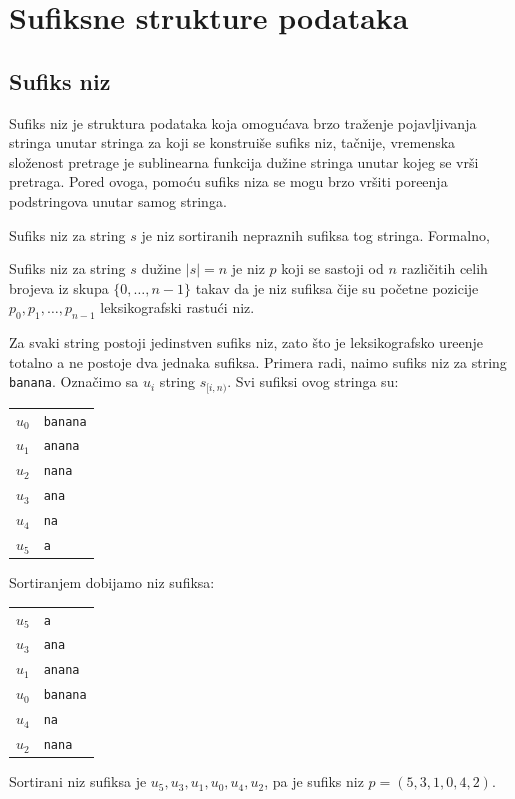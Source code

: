 \section{Sufiksne strukture podataka}

\subsection{Sufiks niz}

Sufiks niz je struktura podataka koja omogu\' cava brzo tra\v zenje pojavljivanja stringa unutar stringa za koji se konstrui\v se sufiks niz, ta\v cnije, vremenska slo\v zenost pretrage je sublinearna funkcija du\v zine stringa unutar kojeg se vr\v si pretraga. Pored ovoga, pomo\' cu sufiks niza se mogu brzo vr\v siti pore\dj enja podstringova unutar samog stringa. \cite{sufiksnizprvirad}

Sufiks niz za string $s$ je niz sortiranih nepraznih sufiksa tog stringa. Formalno,

\begin{dfn}
Sufiks niz za string $s$ du\v zine $|s| = n$ je niz $p$ koji se sastoji od $n$ razli\v citih celih brojeva iz skupa $\{0,\ldots,n-1\}$ takav da je niz sufiksa \v cije su po\v cetne pozicije $p_0, p_1, \ldots, p_{n-1}$ leksikografski rastu\' ci niz.
\end{dfn}

Za svaki string postoji jedinstven sufiks niz, zato \v sto je leksikografsko ure\dj enje totalno a ne postoje dva jednaka sufiksa. Primera radi, na\dj imo sufiks niz za string \texttt{banana}. Ozna\v cimo sa $u_i$ string $s_{[i,n)}$. Svi sufiksi ovog stringa su:
\begin{center}
\begin{tabular}{cl}
    $u_0$ & \texttt{banana} \\
    $u_1$ & \texttt{anana} \\
    $u_2$ & \texttt{nana} \\
    $u_3$ & \texttt{ana} \\
    $u_4$ & \texttt{na} \\
    $u_5$ & \texttt{a} \\
\end{tabular}
\end{center}
Sortiranjem dobijamo niz sufiksa:
\begin{center}
\begin{tabular}{cl}
    $u_5$ & \texttt{a} \\
    $u_3$ & \texttt{ana} \\
    $u_1$ & \texttt{anana} \\
    $u_0$ & \texttt{banana} \\
    $u_4$ & \texttt{na} \\
    $u_2$ & \texttt{nana} \\
\end{tabular}
\end{center}
Sortirani niz sufiksa je $u_5, u_3, u_1, u_0, u_4, u_2$, pa je sufiks niz $p = (5,3,1,0,4,2)$.

